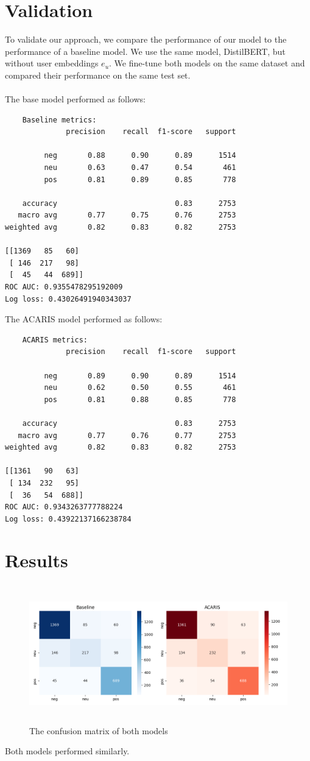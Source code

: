 \documentclass{article}
\begin{document}
\section{Validation}
To validate our approach, we compare the performance of our model to the performance of a baseline model. We use the same model, DistilBERT, but without user embeddings $e_u$. We fine-tune both models on the same dataset and compared their performance on the same test set.\\\\
The base model performed as follows:
\begin{lstlisting}
	Baseline metrics:
              precision    recall  f1-score   support

         neg       0.88      0.90      0.89      1514
         neu       0.63      0.47      0.54       461
         pos       0.81      0.89      0.85       778

    accuracy                           0.83      2753
   macro avg       0.77      0.75      0.76      2753
weighted avg       0.82      0.83      0.82      2753

[[1369   85   60]
 [ 146  217   98]
 [  45   44  689]]
ROC AUC: 0.9355478295192009
Log loss: 0.43026491940343037
\end{lstlisting}
The ACARIS model performed as follows:
\begin{lstlisting}
	ACARIS metrics:
              precision    recall  f1-score   support

         neg       0.89      0.90      0.89      1514
         neu       0.62      0.50      0.55       461
         pos       0.81      0.88      0.85       778

    accuracy                           0.83      2753
   macro avg       0.77      0.76      0.77      2753
weighted avg       0.82      0.83      0.82      2753

[[1361   90   63]
 [ 134  232   95]
 [  36   54  688]]
ROC AUC: 0.9343263777788224
Log loss: 0.43922137166238784
\end{lstlisting}
\break
\section{Results}
\begin{figure}[h!]
	\centering
	\includegraphics[width=\textwidth,height=6cm]{images/confusion_matrix.png}
	\caption{The confusion matrix of both models}
	\label{fig:Conf}
\end{figure}
Both models performed similarly.
\end{document}
